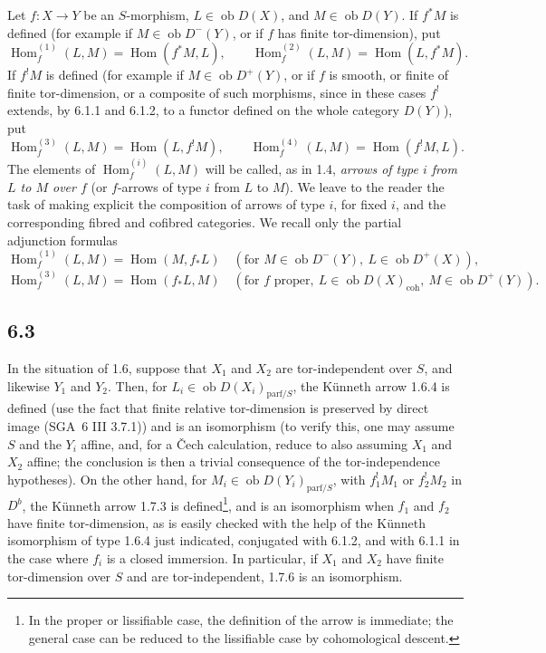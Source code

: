 \documentclass[11pt]{article}
\DeclareMathOperator{\Hom}{Hom}
\providecommand{\Hom}{\operatorname{Hom}}
\providecommand{\Hom}{\operatorname{Hom}}
\begin{document}
Let $f:X\to Y$ be an $S$-morphism, $L\in\operatorname{ob}D(X)$, and $M\in\operatorname{ob}D(Y)$. If $f^*M$ is defined (for example if $M\in\operatorname{ob}D^-(Y)$, or if $f$ has finite tor-dimension), put
\[
\Hom_f^{(1)}(L,M)=\Hom(f^*M,L),\qquad
\Hom_f^{(2)}(L,M)=\Hom(L,f^*M).
\]
If $f^!M$ is defined (for example if $M\in\operatorname{ob}D^+(Y)$, or if $f$ is smooth, or finite of finite tor-dimension, or a composite of such morphisms, since in these cases $f^!$ extends, by 6.1.1 and 6.1.2, to a functor defined on the whole category $D(Y)$), put
\[
\Hom_f^{(3)}(L,M)=\Hom(L,f^!M),\qquad
\Hom_f^{(4)}(L,M)=\Hom(f^!M,L).
\]
The elements of $\Hom_f^{(i)}(L,M)$ will be called, as in 1.4, \emph{arrows of type $i$ from $L$ to $M$ over $f$} (or $f$-arrows of type $i$ from $L$ to $M$). We leave to the reader the task of making explicit the composition of arrows of type $i$, for fixed $i$, and the corresponding fibred and cofibred categories. We recall only the partial adjunction formulas
\[
\Hom_f^{(1)}(L,M)=\Hom(M,f_*L)\quad(\text{for }M\in\operatorname{ob}D^{-}(Y),\ L\in\operatorname{ob}D^+(X)),
\]
\[
\Hom_f^{(3)}(L,M)=\Hom(f_*L,M)\quad(\text{for }f\text{ proper},\ L\in\operatorname{ob}D(X)_{\mathrm{coh}},\ M\in\operatorname{ob}D^+(Y)).
\]

\subsection*{6.3}
In the situation of 1.6, suppose that $X_1$ and $X_2$ are tor-independent over $S$, and likewise $Y_1$ and $Y_2$. Then, for $L_i\in\operatorname{ob}D(X_i)_{\mathrm{parf}/S}$, the Künneth arrow 1.6.4 is defined (use the fact that finite relative tor-dimension is preserved by direct image (SGA~6 III 3.7.1)) and is an isomorphism (to verify this, one may assume $S$ and the $Y_i$ affine, and, for a Čech calculation, reduce to also assuming $X_1$ and $X_2$ affine; the conclusion is then a trivial consequence of the tor-independence hypotheses). On the other hand, for $M_i\in\operatorname{ob}D(Y_i)_{\mathrm{parf}/S}$, with $f_1^!M_1$ or $f_2^!M_2$ in $D^b$, the Künneth arrow 1.7.3 is defined\footnote{In the proper or lissifiable case, the definition of the arrow is immediate; the general case can be reduced to the lissifiable case by cohomological descent.}, and is an isomorphism when $f_1$ and $f_2$ have finite tor-dimension, as is easily checked with the help of the Künneth isomorphism of type 1.6.4 just indicated, conjugated with 6.1.2, and with 6.1.1 in the case where $f_i$ is a closed immersion. In particular, if $X_1$ and $X_2$ have finite tor-dimension over $S$ and are tor-independent, 1.7.6 is an isomorphism.
\end{document}
